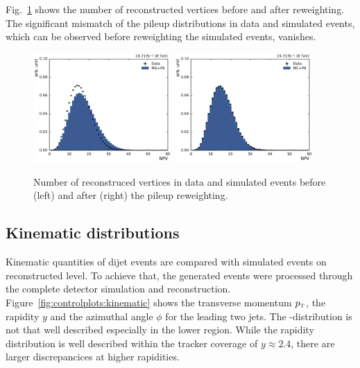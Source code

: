 Fig.~\ref{fig:mc:npv_reweighting} shows the number of reconstructed vertices
before and after reweighting. The significant mismatch of the
pileup distributions in data and simulated events, which can be observed before
reweighting the simulated events, vanishes.

\begin{figure}[htbp]
    \centering
    \includegraphics[width=0.47\textwidth]{figures/measurement/npv_beforereweighting.pdf}\hfill
    \includegraphics[width=0.47\textwidth]{figures/measurement/npv_afterreweighting.pdf}
    \caption[Number of reconstructed vertices]{Number of reconstruced vertices in data and simulated events before
    (left) and after (right) the pileup reweighting.}
    \label{fig:mc:npv_reweighting}
\end{figure}

\subsection{Kinematic distributions}

Kinematic quantities of dijet events are compared with simulated events on
reconstructed level. To achieve that, the generated events were processed
through the complete detector simulation and reconstruction.
Figure~\ref{fig:controlplots:kinematic} shows the transverse momentum $\pt$, the
rapidity $y$ and the azimuthal angle $\phi$ for the leading two jets. The
\pt-distribution is not that well described especially in the lower \pt region.
While the rapidity distribution is well described within the tracker coverage of
$y \approx 2.4$, there are larger discrepancices at higher rapidities.

